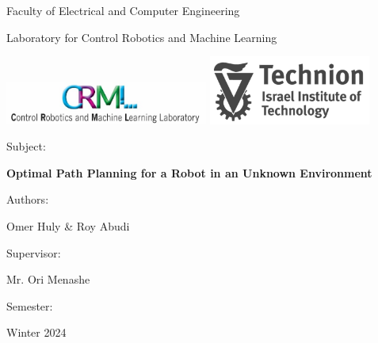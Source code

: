 \begin{titlepage}
    \begin{center}
        {\Large Faculty of Electrical and Computer Engineering}

        {\Large Laboratory for Control Robotics and Machine Learning}

        \vspace{1cm}
        
        \includegraphics[width=0.5\textwidth]{images/CRML_logo.jpg}
        \includegraphics[width=0.4\textwidth]{images/Technion_logo.png}

        \vspace{1.5cm}

        Subject:

        \vspace{0.3cm}
        
        \textbf{\Huge Optimal Path Planning for a Robot in an Unknown Environment}
            
        \vspace{1.5cm}

        Authors:
        
        \vspace{0.3cm}
        
        {\Large
            Omer Huly
            \&
            Roy Abudi}

        \vspace{1cm}

        Supervisor:

        \vspace{0.3cm}
        
        {\Large Mr. Ori Menashe}

        \vspace{1cm}

        Semester:

        \vspace{0.3cm}
        
       {\Large Winter 2024}        
    \end{center}
\end{titlepage}